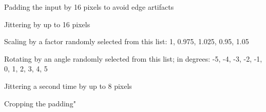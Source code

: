 \documentclass[]{scrartcl}
\begin{document}
Padding the input by 16 pixels to avoid edge artifacts

Jittering by up to 16 pixels

Scaling by a factor randomly selected from this list: 1, 0.975, 1.025, 0.95, 1.05

Rotating by an angle randomly selected from this list; in degrees: -5, -4, -3, -2, -1, 0, 1, 2, 3, 4, 5

Jittering a second time by up to 8 pixels

Cropping the padding" \cite{Olah2017}

{}

\end{document}
